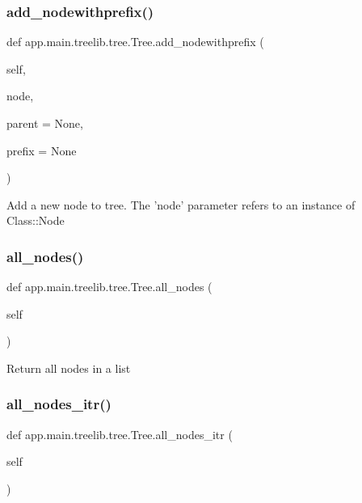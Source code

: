 \subsubsection{\texorpdfstring{add\+\_\+nodewithprefix()}{add\_nodewithprefix()}}
{\footnotesize\ttfamily def app.\+main.\+treelib.\+tree.\+Tree.\+add\+\_\+nodewithprefix (\begin{DoxyParamCaption}\item[{}]{self,  }\item[{}]{node,  }\item[{}]{parent = {\ttfamily None},  }\item[{}]{prefix = {\ttfamily None} }\end{DoxyParamCaption})}

\begin{DoxyVerb}Add a new node to tree.
The 'node' parameter refers to an instance of Class::Node
\end{DoxyVerb}
 \mbox{\label{classapp_1_1main_1_1treelib_1_1tree_1_1Tree_a9d35f4e9e51cbccc98314ae78bb73a8f}} 
\subsubsection{\texorpdfstring{all\+\_\+nodes()}{all\_nodes()}}
{\footnotesize\ttfamily def app.\+main.\+treelib.\+tree.\+Tree.\+all\+\_\+nodes (\begin{DoxyParamCaption}\item[{}]{self }\end{DoxyParamCaption})}

\begin{DoxyVerb}Return all nodes in a list\end{DoxyVerb}
 \mbox{\label{classapp_1_1main_1_1treelib_1_1tree_1_1Tree_a6ec89f6f37ff6bee77e0c10d4270817c}} 
\subsubsection{\texorpdfstring{all\+\_\+nodes\+\_\+itr()}{all\_nodes\_itr()}}
{\footnotesize\ttfamily def app.\+main.\+treelib.\+tree.\+Tree.\+all\+\_\+nodes\+\_\+itr (\begin{DoxyParamCaption}\item[{}]{self }\end{DoxyParamCaption})}

